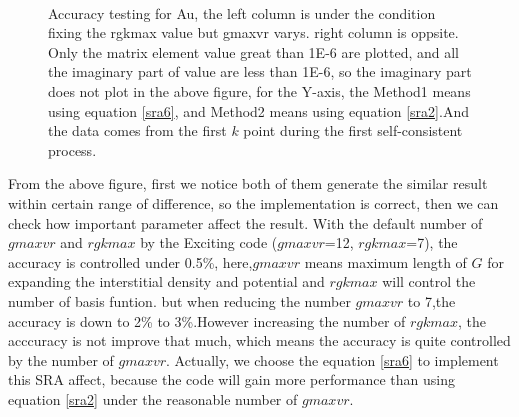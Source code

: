 \documentclass[a4paper]{report}
\begin{document}
\begin{figure}[ht!]
\begin{center}
{        }\\%
    \end{center}
    \caption{%
        Accuracy testing for Au, the left column is under the condition fixing the rgkmax value but gmaxvr varys.
        right column is oppsite. Only the matrix element value great than 1E-6 are plotted, and all the imaginary part of value are 
        less than 1E-6, so the imaginary part does not plot in the above figure, for the Y-axis, the Method1 means using equation \ref{sra6}, and Method2 means using 
        equation \ref{sra2}.And the data comes from the first $k$ point during the first self-consistent process.
     }%
   \label{fig:subfigures}
\end{figure}





\vspace{100cm}
From the above figure, first we notice both of them generate the similar result within certain range of difference, so the implementation is correct, then 
we can check how important parameter affect the result. With the default number of $gmaxvr$ and $rgkmax$ by the Exciting code ($gmaxvr$=12, $rgkmax$=7), 
the accuracy is controlled under 0.5\%, here,$gmaxvr$ means maximum length of $G$ for expanding the interstitial density and potential and $rgkmax$ will 
control the number of basis funtion. but when reducing the number $gmaxvr$ to 7,the accuracy is down to 2\% to 3\%.However increasing the number of $rgkmax$, 
the acccuracy is not improve that much, which means the accuracy is quite controlled by the number of $gmaxvr$. Actually, 
we choose the equation \ref{sra6} to implement this SRA affect, because the code will gain more performance than using equation \ref{sra2} under the reasonable number
of $gmaxvr$.
\end{document}
